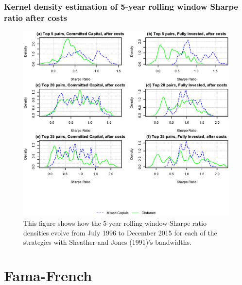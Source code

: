\documentclass[pdf,9pt,xcolor=dvipsnames,hide notes]{beamer}
\begin{document}
\begin{frame}[label=frame5c]
\frametitle{Kernel density estimation of 5-year rolling window Sharpe ratio after costs}

\begin{figure}[!ht]
	\centering
	\includegraphics[scale=0.47]{Figure5.eps}
	\captionsetup{justification=raggedright,
		singlelinecheck=false
	}
	\caption*{\tiny  This figure shows how the 5-year rolling window Sharpe ratio densities evolve from July 1996 to December 2015 for each of the strategies with Sheather and Jones (1991)'s bandwidths.}
	\label{fig:fig5}
\end{figure}

\end{frame}


\section{Fama-French}
\end{document}

